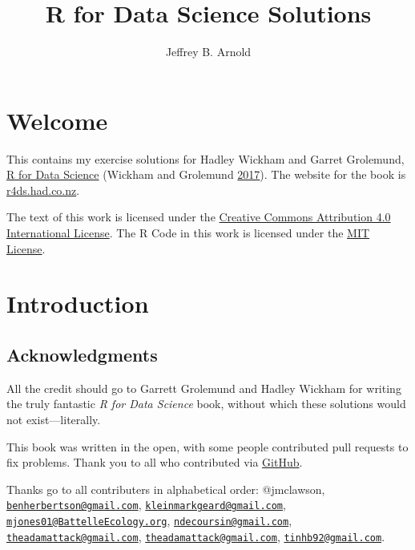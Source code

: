 \documentclass[]{book}
\title{R for Data Science Solutions}
\author{Jeffrey B. Arnold}
\date{}
\theoremstyle{plain}
\theoremstyle{remark}
\theoremstyle{definition}
\theoremstyle{definition}
\theoremstyle{definition}
\theoremstyle{remark}
\begin{document}
\maketitle

{
\setcounter{tocdepth}{1}
\tableofcontents
}
\hypertarget{welcome}{%
\chapter*{Welcome}\label{welcome}}

This contains my exercise solutions for Hadley Wickham and Garret
Grolemund, \href{http://amzn.to/2aHLAQ1}{R for Data Science} (Wickham
and Grolemund \protect\hyperlink{ref-WickhamGrolemund2017}{2017}). The
website for the book is \href{http://r4ds.had.co.nz/}{r4ds.had.co.nz}.

The text of this work is licensed under the
\href{http://creativecommons.org/licenses/by/4.0/}{Creative Commons
Attribution 4.0 International License}. The R Code in this work is
licensed under the \href{https://opensource.org/licenses/MIT}{MIT
License}.

\hypertarget{introduction}{%
\chapter{Introduction}\label{introduction}}

\hypertarget{acknowledgments}{%
\section*{Acknowledgments}\label{acknowledgments}}

All the credit should go to Garrett Grolemund and Hadley Wickham for
writing the truly fantastic \emph{R for Data Science} book, without
which these solutions would not exist---literally.

This book was written in the open, with some people contributed pull
requests to fix problems. Thank you to all who contributed via
\href{https://github.com/jrnold/r4ds-exercise-solutions/graphs/contributors}{GitHub}.

Thanks go to all contributers in alphabetical order: @jmclawson,
\href{mailto:benherbertson@gmail.com}{\nolinkurl{benherbertson@gmail.com}},
\href{mailto:kleinmarkgeard@gmail.com}{\nolinkurl{kleinmarkgeard@gmail.com}},
\href{mailto:mjones01@BattelleEcology.org}{\nolinkurl{mjones01@BattelleEcology.org}},
\href{mailto:ndecoursin@gmail.com}{\nolinkurl{ndecoursin@gmail.com}},
\href{mailto:theadamattack@gmail.com}{\nolinkurl{theadamattack@gmail.com}},
\href{mailto:theadamattack@gmail.com}{\nolinkurl{theadamattack@gmail.com}},
\href{mailto:tinhb92@gmail.com}{\nolinkurl{tinhb92@gmail.com}}.
\end{document}
